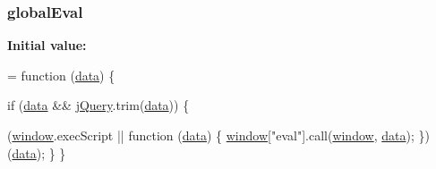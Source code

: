 \subsubsection[{\texorpdfstring{global\+Eval}{globalEval}}]{ global\+Eval}\hypertarget{jquery-2_82_81-vsdoc_8js_a898e1e411825feebc0c78978f2a2a140}{}\label{jquery-2_82_81-vsdoc_8js_a898e1e411825feebc0c78978f2a2a140}
{\bfseries Initial value\+:}
\begin{DoxyCode}
= \textcolor{keyword}{function} (\hyperlink{jquery-2_82_81-vsdoc_8js_a609407b3456fdc3c5671a9fc4a226ff7}{data}) \{
        

        \textcolor{keywordflow}{if} (\hyperlink{jquery-2_82_81-vsdoc_8js_a609407b3456fdc3c5671a9fc4a226ff7}{data} && \hyperlink{jquery-2_82_81-vsdoc_8js_add5237586d970a38a81f990e8eb28c6c}{jQuery}.trim(\hyperlink{jquery-2_82_81-vsdoc_8js_a609407b3456fdc3c5671a9fc4a226ff7}{data})) \{
            
            
            
            (\hyperlink{jquery-2_82_81-vsdoc_8js_a04a8a2bbfa9c15500892b8e5033d625b}{window}.execScript || \textcolor{keyword}{function} (\hyperlink{jquery-2_82_81-vsdoc_8js_a609407b3456fdc3c5671a9fc4a226ff7}{data}) \{
                \hyperlink{jquery-2_82_81-vsdoc_8js_a04a8a2bbfa9c15500892b8e5033d625b}{window}[\textcolor{stringliteral}{"eval"}].call(\hyperlink{jquery-2_82_81-vsdoc_8js_a04a8a2bbfa9c15500892b8e5033d625b}{window}, \hyperlink{jquery-2_82_81-vsdoc_8js_a609407b3456fdc3c5671a9fc4a226ff7}{data});
            \})(\hyperlink{jquery-2_82_81-vsdoc_8js_a609407b3456fdc3c5671a9fc4a226ff7}{data});
        \}
    \}
\end{DoxyCode}

